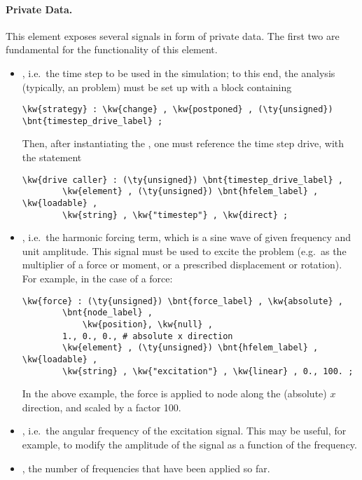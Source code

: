\paragraph{Private Data.}
This element exposes several signals in form of private data.
The first two are fundamental for the functionality of this element.
\begin{itemize}
\item {}, i.e.\ the time step to be used in the simulation; to this end, the analysis (typically, an  problem) must be set up with a  block containing
\begin{Verbatim}[commandchars=\\\{\}]
    \kw{strategy} : \kw{change} , \kw{postponed} , (\ty{unsigned}) \bnt{timestep_drive_label} ;
\end{Verbatim}
Then, after instantiating the , one must reference the time step drive, with the statement
\begin{Verbatim}[commandchars=\\\{\}]
    \kw{drive caller} : (\ty{unsigned}) \bnt{timestep_drive_label} ,
        \kw{element} , (\ty{unsigned}) \bnt{hfelem_label} , \kw{loadable} ,
        \kw{string} , \kw{"timestep"} , \kw{direct} ;
\end{Verbatim}

\item {}, i.e.\ the harmonic forcing term, which is a sine wave of given frequency and unit amplitude.
This signal must be used to excite the problem (e.g.\ as the multiplier of a force or moment, or a prescribed displacement or rotation).
For example, in the case of a force:
\begin{Verbatim}[commandchars=\\\{\}]
    \kw{force} : (\ty{unsigned}) \bnt{force_label} , \kw{absolute} ,
        \bnt{node_label} ,
            \kw{position}, \kw{null} ,
        1., 0., 0., # absolute x direction
        \kw{element} , (\ty{unsigned}) \bnt{hfelem_label} , \kw{loadable} ,
        \kw{string} , \kw{"excitation"} , \kw{linear} , 0., 100. ;
\end{Verbatim}
In the above example, the force is applied to node 
along the (absolute) $x$ direction, and scaled by a factor 100.


\item {}, i.e.\ the angular frequency of the excitation signal.
This may be useful, for example, to modify the amplitude of the signal as a function of the frequency.

\item {}, the number of frequencies that have been applied so far.

\end{itemize}

